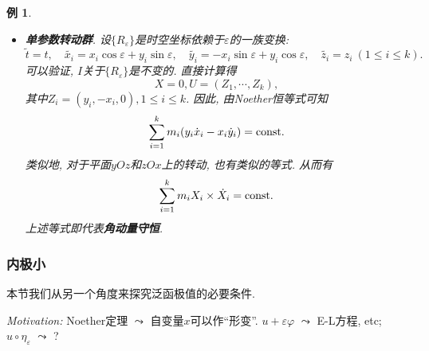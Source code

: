 \documentclass[12pt,a4paper]{article}
\newtheorem{example}[theorem]{例}
\begin{document}
\begin{example}
\begin{itemize}
        \begin{equation*}
            H = pL_p - L = {\rm const}. 
        \end{equation*}
        这是\textbf{能量守恒}.
        \item \textbf{单参数转动群}. 设$\{R_{\varepsilon}\}$是时空坐标依赖于$\varepsilon$的一族变换:
        \begin{equation*}
            \widetilde{t} = t, \quad \widetilde{x_i} = x_i\cos\varepsilon + y_i\sin\varepsilon, \quad \widetilde{y_i} = -x_i\sin\varepsilon + y_i\cos\varepsilon, \quad \widetilde{z_i} = z_i \ (1 \leq i \leq k).
        \end{equation*}
        可以验证, $I$关于$\{R_{\varepsilon}\}$是不变的. 直接计算得
        \begin{equation*}
            X = 0, U = (Z_1, \cdots, Z_k), 
        \end{equation*}
        其中$Z_i= (y_i, -x_i, 0), 1 \leq i \leq k$. 因此, 由Noether恒等式可知
        \begin{equation*}
            \sum_{i = 1}^km_i(y_i\dot x_i - x_i\dot y_i) = {\rm const}. 
        \end{equation*}
        类似地, 对于平面$yOz$和$zOx$上的转动, 也有类似的等式. 从而有
        \begin{equation*}
            \sum_{i = 1}^km_i X_i \times \dot X_i = {\rm const}.
        \end{equation*}
        上述等式即代表\textbf{角动量守恒}.
    \end{itemize}
\end{example}

\subsubsection{内极小}

本节我们从另一个角度来探究泛函极值的必要条件.

\emph{Motivation:} Noether定理 $\leadsto$ 自变量$x$可以作``形变''. 
$u + \varepsilon\varphi$ $\leadsto$ E-L方程, etc; $u \circ \eta_{\varepsilon}$ $\leadsto$ ? 
\end{document}
